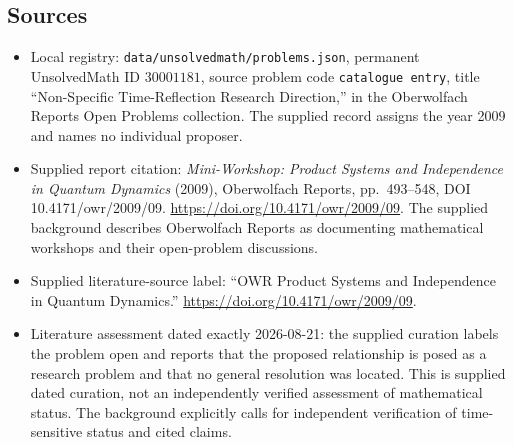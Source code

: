 \documentclass[11pt]{article}
\begin{document}
\subsection{Sources}
\begin{itemize}
\item Local registry: \texttt{data/unsolvedmath/problems.json}, permanent UnsolvedMath ID \(30001181\), source problem code \texttt{catalogue entry}, title ``Non-Specific Time-Reflection Research Direction,'' in the Oberwolfach Reports Open Problems collection. The supplied record assigns the year 2009 and names no individual proposer.
\item Supplied report citation: \emph{Mini-Workshop: Product Systems and Independence in Quantum Dynamics} (2009), Oberwolfach Reports, pp.\ 493--548, DOI 10.4171/owr/2009/09. \url{https://doi.org/10.4171/owr/2009/09}. The supplied background describes Oberwolfach Reports as documenting mathematical workshops and their open-problem discussions.
\item Supplied literature-source label: ``OWR Product Systems and Independence in Quantum Dynamics.'' \url{https://doi.org/10.4171/owr/2009/09}.
\item Literature assessment dated exactly 2026-08-21: the supplied curation labels the problem open and reports that the proposed relationship is posed as a research problem and that no general resolution was located. This is supplied dated curation, not an independently verified assessment of mathematical status. The background explicitly calls for independent verification of time-sensitive status and cited claims.
\end{itemize}
\end{document}
